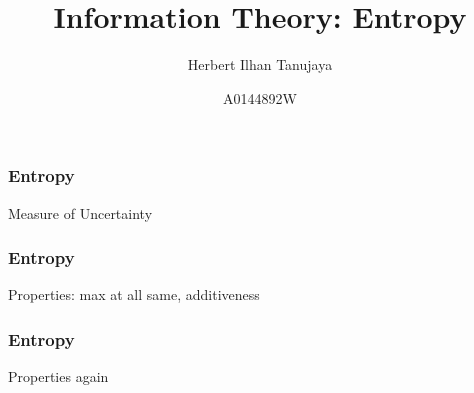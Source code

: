 \documentclass{beamer}
\title{Information Theory: Entropy}
\author{Herbert Ilhan Tanujaya}
\date{A0144892W}
\begin{document}
\begin{frame}
	\titlepage
\end{frame}

\begin{frame}
  \frametitle{Entropy}
	Measure of Uncertainty
\end{frame}

\begin{frame}
  \frametitle{Entropy}
  Properties: max at all same, additiveness
\end{frame}

\begin{frame}
  \frametitle{Entropy}
  Properties again
\end{frame}
\end{document}
